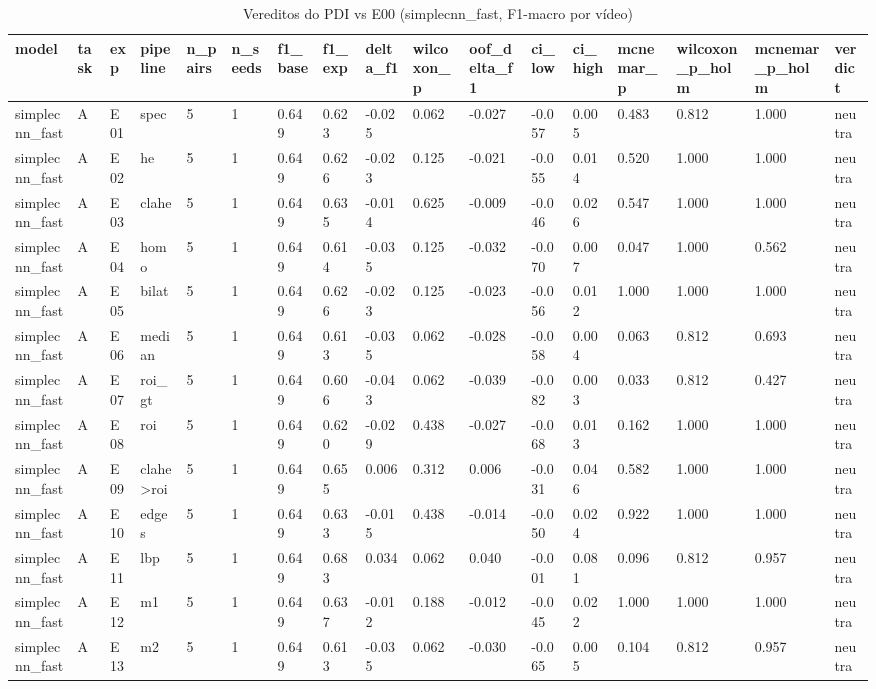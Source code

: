\begin{table}[ht]
\centering
\caption{Vereditos do PDI vs E00 (simplecnn_fast, F1-macro por vídeo)}
\begin{tabular}{lllllllllllllllll}
\toprule
model & task & exp & pipeline & n\_pairs & n\_seeds & f1\_base & f1\_exp & delta\_f1 & wilcoxon\_p & oof\_delta\_f1 & ci\_low & ci\_high & mcnemar\_p & wilcoxon\_p\_holm & mcnemar\_p\_holm & verdict \\
\midrule
simplecnn\_fast & A & E01 & spec & 5 & 1 & 0.649 & 0.623 & -0.025 & 0.062 & -0.027 & -0.057 & 0.005 & 0.483 & 0.812 & 1.000 & neutra \\
simplecnn\_fast & A & E02 & he & 5 & 1 & 0.649 & 0.626 & -0.023 & 0.125 & -0.021 & -0.055 & 0.014 & 0.520 & 1.000 & 1.000 & neutra \\
simplecnn\_fast & A & E03 & clahe & 5 & 1 & 0.649 & 0.635 & -0.014 & 0.625 & -0.009 & -0.046 & 0.026 & 0.547 & 1.000 & 1.000 & neutra \\
simplecnn\_fast & A & E04 & homo & 5 & 1 & 0.649 & 0.614 & -0.035 & 0.125 & -0.032 & -0.070 & 0.007 & 0.047 & 1.000 & 0.562 & neutra \\
simplecnn\_fast & A & E05 & bilat & 5 & 1 & 0.649 & 0.626 & -0.023 & 0.125 & -0.023 & -0.056 & 0.012 & 1.000 & 1.000 & 1.000 & neutra \\
simplecnn\_fast & A & E06 & median & 5 & 1 & 0.649 & 0.613 & -0.035 & 0.062 & -0.028 & -0.058 & 0.004 & 0.063 & 0.812 & 0.693 & neutra \\
simplecnn\_fast & A & E07 & roi\_gt & 5 & 1 & 0.649 & 0.606 & -0.043 & 0.062 & -0.039 & -0.082 & 0.003 & 0.033 & 0.812 & 0.427 & neutra \\
simplecnn\_fast & A & E08 & roi & 5 & 1 & 0.649 & 0.620 & -0.029 & 0.438 & -0.027 & -0.068 & 0.013 & 0.162 & 1.000 & 1.000 & neutra \\
simplecnn\_fast & A & E09 & clahe>roi & 5 & 1 & 0.649 & 0.655 & 0.006 & 0.312 & 0.006 & -0.031 & 0.046 & 0.582 & 1.000 & 1.000 & neutra \\
simplecnn\_fast & A & E10 & edges & 5 & 1 & 0.649 & 0.633 & -0.015 & 0.438 & -0.014 & -0.050 & 0.024 & 0.922 & 1.000 & 1.000 & neutra \\
simplecnn\_fast & A & E11 & lbp & 5 & 1 & 0.649 & 0.683 & 0.034 & 0.062 & 0.040 & -0.001 & 0.081 & 0.096 & 0.812 & 0.957 & neutra \\
simplecnn\_fast & A & E12 & m1 & 5 & 1 & 0.649 & 0.637 & -0.012 & 0.188 & -0.012 & -0.045 & 0.022 & 1.000 & 1.000 & 1.000 & neutra \\
simplecnn\_fast & A & E13 & m2 & 5 & 1 & 0.649 & 0.613 & -0.035 & 0.062 & -0.030 & -0.065 & 0.005 & 0.104 & 0.812 & 0.957 & neutra \\

\end{tabular}
\end{table}
